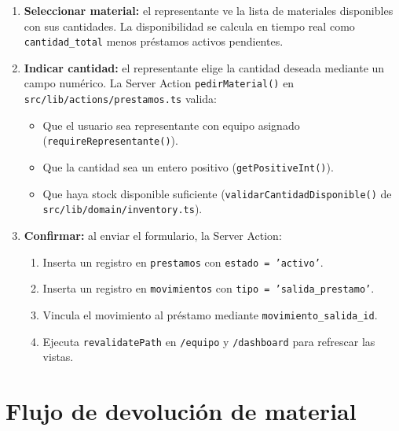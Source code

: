 \documentclass[12pt,a4paper,oneside]{report}
\newcommand{\file}[1]{\texttt{\color{cecyteDark}#1}}
\begin{document}
\begin{enumerate}
  \item \textbf{Seleccionar material:} el representante ve la lista de materiales disponibles con sus cantidades. La disponibilidad se calcula en tiempo real como \file{cantidad\_total} menos préstamos activos pendientes.
  \item \textbf{Indicar cantidad:} el representante elige la cantidad deseada mediante un campo numérico. La Server Action \file{pedirMaterial()} en \file{src/lib/actions/prestamos.ts} valida:
    \begin{itemize}
      \item Que el usuario sea representante con equipo asignado (\file{requireRepresentante()}).
      \item Que la cantidad sea un entero positivo (\file{getPositiveInt()}).
      \item Que haya stock disponible suficiente (\file{validarCantidadDisponible()} de \file{src/lib/domain/inventory.ts}).
    \end{itemize}
  \item \textbf{Confirmar:} al enviar el formulario, la Server Action:
    \begin{enumerate}
      \item Inserta un registro en \file{prestamos} con \file{estado = 'activo'}.
      \item Inserta un registro en \file{movimientos} con \file{tipo = 'salida\_prestamo'}.
      \item Vincula el movimiento al préstamo mediante \file{movimiento\_salida\_id}.
      \item Ejecuta \file{revalidatePath} en \file{/equipo} y \file{/dashboard} para refrescar las vistas.
    \end{enumerate}
\end{enumerate}

\section{Flujo de devolución de material}
\end{document}
